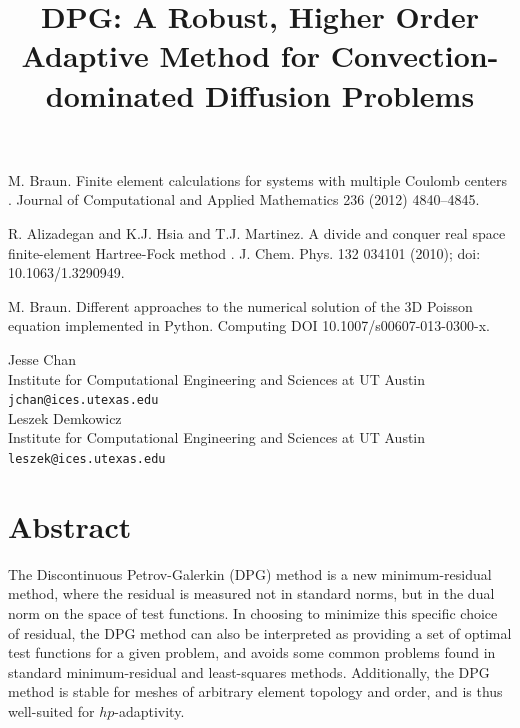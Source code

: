 \documentclass[article,A4,11pt]{llncs}%
\begin{document}

\begin{thebibliography}{10}
{\sc M. Braun}. { Finite element calculations for systems with multiple Coulomb centers }. Journal of Computational and Applied Mathematics 236 (2012) 4840–4845.

{\sc R. Alizadegan and K.J. Hsia and T.J. Martinez}. {A divide and conquer real space finite-element Hartree-Fock method }. J. Chem. Phys. 132 034101 (2010); doi: 10.1063/1.3290949.

{\sc M. Braun}. {Different approaches to the numerical solution of the 3D Poisson equation implemented in Python}. Computing DOI 10.1007/s00607-013-0300-x.
\end{thebibliography}

\title{DPG: A Robust, Higher Order Adaptive Method for Convection-dominated Diffusion Problems}
 \author{} \institute{}
\maketitle
\begin{center}
{\large Jesse Chan}\\
Institute for Computational Engineering and Sciences at UT Austin\\
{\tt jchan@ices.utexas.edu}
\\ \vspace{4mm}
{\large Leszek  Demkowicz}\\
Institute for Computational Engineering and Sciences at UT Austin\\
{\tt leszek@ices.utexas.edu}
\end{center}

\section*{Abstract}
The Discontinuous Petrov-Galerkin (DPG) method is a new minimum-residual method, where the residual is measured not in standard norms, but in the dual norm on the space of test functions.  In choosing to minimize this specific choice of residual, the DPG method can also be interpreted as providing a set of optimal test functions for a given problem, and avoids some common problems found in standard minimum-residual and least-squares methods.  Additionally, the DPG method is stable for meshes of arbitrary element topology and order, and is thus well-suited for $hp$-adaptivity.  
\end{document}
